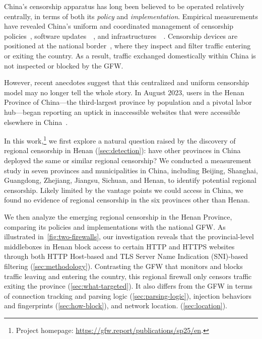 \documentclass[conference,compsoc]{IEEEtran}
\begin{document}
China's censorship apparatus has long been believed to be operated relatively centrally,
in terms of both its \textit{policy} and \textit{implementation}.
Empirical measurements have revealed China's %
uniform and coordinated management of
censorship policies~\cite{Anonymous2020a, Hoang2021a, Wu2023a, Hoang2024a},
software updates~\cite[\S4.5]{Sakamoto2024a}~\cite[\S VII]{Fan2025a},
and infrastructures~\cite[\S3.4]{Alice2020a}~\cite[\S 5]{Anonymous2020a}.
Censorship devices are positioned at the national border~\cite{Xu2011a, Wright2012a, Anonymous2020a},
where they inspect and filter traffic entering or exiting the country.
As a result, traffic exchanged domestically within China is not inspected or blocked by the GFW.

However, recent anecdotes suggest that this centralized and uniform censorship model
may no longer tell the whole story.
In August 2023, users in the Henan Province of China---the third-largest province by
population and a pivotal labor hub---began reporting an uptick in inaccessible
websites that were accessible elsewhere in China~\cite{Henan-user-report}.

In this work,\footnote{Project homepage: \url{https://gfw.report/publications/sp25/en}.}
we first explore a natural question raised by the discovery of
regional censorship in Henan (\autoref{sec:detection}): have other provinces in
China deployed the same or similar regional censorship?  We conducted a
measurement study in seven provinces and municipalities in China, including
Beijing, Shanghai, Guangdong, Zhejiang, Jiangsu, Sichuan, and Henan, to identify
potential regional censorship.
Likely limited by the vantage points we could access in China,
we found no evidence of regional censorship in the six provinces other than Henan.

We then analyze the emerging regional censorship in the Henan Province,
comparing its policies and implementations with the national GFW.
%
As illustrated in~\autoref{fig:two-firewalls}, our investigation reveals that
the provincial-level middleboxes in Henan block access to certain HTTP and HTTPS
websites through both HTTP Host-based and TLS Server Name Indication (SNI)-based
filtering (\autoref{sec:methodology}).  Contrasting the GFW that monitors and
blocks traffic leaving and entering the country, this regional firewall only
censors traffic exiting the province (\autoref{sec:what-targeted}).  It also
differs from the GFW in terms of connection tracking and parsing logic
(\autoref{sec:parsing-logic}), injection behaviors and fingerprints
(\autoref{sec:how-block}), and network location.  (\autoref{sec:location}).
\end{document}
